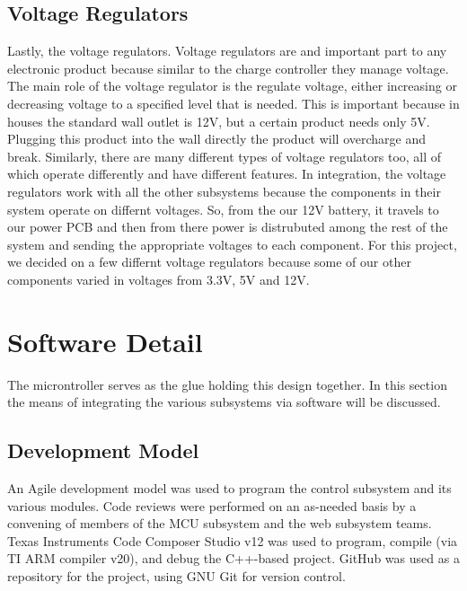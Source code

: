 \documentclass[journal]{IEEEtran}
\begin{document}
\subsection{Voltage Regulators} \label{sec:voltage regulator}
Lastly, the voltage regulators. Voltage regulators are and important part to any electronic product because 
similar to the charge controller they manage voltage. The main role of the voltage regulator is the regulate 
voltage, either increasing or decreasing voltage to a specified level that is needed. This is important 
because in houses the standard wall outlet is 12V, but a certain product needs only 5V. Plugging this product 
into the wall directly the product will overcharge and break. Similarly, there are many different types of 
voltage regulators too, all of which operate differently and have different features. In integration, the 
voltage regulators work with all the other subsystems because the components in their system operate on 
differnt voltages. So, from the our 12V battery, it travels to our power PCB and then from there power is 
distrubuted among the rest of the system and sending the appropriate voltages to each component. For this 
project, we decided on a few differnt voltage regulators because some of our other components varied in 
voltages from 3.3V, 5V and 12V. 

\section{Software Detail}
The microntroller serves as the glue holding this design together. In this section the means of
integrating the various subsystems via software will be discussed.
\subsection{Development Model}
An Agile development model was used to program the control subsystem and its various modules. Code reviews were performed on an as-needed basis by a convening of members of the MCU subsystem and the web subsystem teams. Texas Instruments Code Composer Studio v12 was used to program, compile (via TI ARM compiler v20), and debug the C++-based project. GitHub was used as a repository for the project, using GNU Git for version control.
\end{document}
